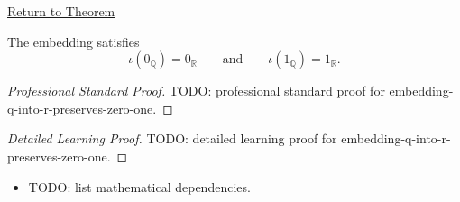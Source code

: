 \newpage
{}
\label{prf:embedding-q-into-r-preserves-zero-one}

\begin{remark*}[Return]
\hyperref[thm:embedding-q-into-r-preserves-zero-one]{Return to Theorem}
\end{remark*}

\begin{theorem*}
The embedding satisfies
\[
\iota(0_{\mathbb{Q}})=0_{\mathbb{R}}
\qquad\text{and}\qquad
\iota(1_{\mathbb{Q}})=1_{\mathbb{R}}.
\]
\end{theorem*}

\begin{proof}[Professional Standard Proof]
\LRAProofBodyStart
TODO: professional standard proof for embedding-q-into-r-preserves-zero-one.
\end{proof}

\begin{proof}[Detailed Learning Proof]
\LRAProofBodyStart
TODO: detailed learning proof for embedding-q-into-r-preserves-zero-one.
\end{proof}

\begin{remark*}
\end{remark*}

\begin{dependencies}
\begin{itemize}
  \item TODO: list mathematical dependencies.
\end{itemize}
\end{dependencies}

\clearpage
